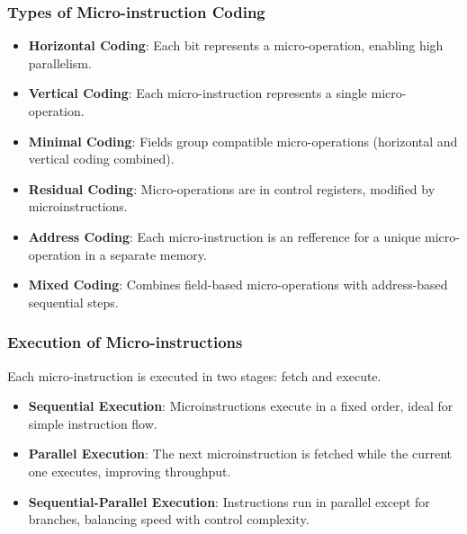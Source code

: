 \begin{frame}
    \frametitle{Types of Micro-instruction Coding}
    \begin{itemize}
        \item \textbf{Horizontal Coding}: Each bit represents a micro-operation, enabling high parallelism.
        \item \textbf{Vertical Coding}: Each micro-instruction represents a single micro-operation.
        \item \textbf{Minimal Coding}: Fields group compatible micro-operations (horizontal and vertical coding combined).
        \item \textbf{Residual Coding}: Micro-operations are in control registers, modified by microinstructions.
        \item \textbf{Address Coding}: Each micro-instruction is an refference for a unique micro-operation in a separate memory.
        \item \textbf{Mixed Coding}: Combines field-based micro-operations with address-based sequential steps.
    \end{itemize}
\end{frame}

\begin{frame}
    \frametitle{Execution of Micro-instructions}
    Each micro-instruction is executed in two stages: fetch and execute.
    \begin{itemize}
        \item \textbf{Sequential Execution}: Microinstructions execute in a fixed order, ideal for simple instruction flow.
        \item \textbf{Parallel Execution}: The next microinstruction is fetched while the current one executes, improving throughput.
        \item \textbf{Sequential-Parallel Execution}: Instructions run in parallel except for branches, balancing speed with control complexity.
    \end{itemize}
\end{frame}

